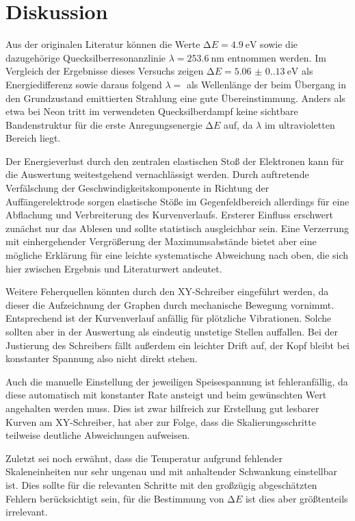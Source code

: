 \section{Diskussion}
\label{sec:diskussion}

Aus der originalen Literatur \cite{franck_hertz} können die Werte $\increment E = \qty{4.9}{\electronvolt}$ sowie die dazugehörige Quecksilberresonanzlinie
$\lambda = \qty{253.6}{\nano\meter}$ entnommen werden. Im Vergleich der Ergebnisse dieses Versuchs zeigen $\increment E = \qty{5.06(0.13)}{\electronvolt}$
als Energiedifferenz sowie daraus folgend $\lambda = $ als Wellenlänge der beim Übergang in den Grundzustand emittierten Strahlung eine
gute Übereinstimmung. Anders als etwa bei Neon tritt im verwendeten Quecksilberdampf keine sichtbare Bandenstruktur für die erste Anregungsenergie
$\increment E$ auf, da $\lambda$ im ultravioletten Bereich liegt. 

Der Energieverlust durch den zentralen elastischen Stoß der Elektronen kann für die Auswertung weitestgehend vernachlässigt werden. Durch auftretende
Verfälschung der Geschwindigkeitskomponente in Richtung der Auffängerelektrode sorgen elastische Stöße im Gegenfeldbereich allerdings für eine Abflachung und
Verbreiterung des Kurvenverlaufs. Ersterer Einfluss erschwert zunächst nur das Ablesen und sollte statistisch ausgleichbar sein. Eine Verzerrung
mit einhergehender Vergrößerung der Maximumsabstände bietet aber eine mögliche Erklärung für eine leichte systematische Abweichung nach oben, die sich
hier zwischen Ergebnis und Literaturwert andeutet.

Weitere Feherquellen könnten durch den XY-Schreiber eingeführt werden, da dieser die Aufzeichnung der Graphen durch mechanische Bewegung vornimmt.
Entsprechend ist der Kurvenverlauf anfällig für plötzliche Vibrationen. Solche sollten aber in der Auswertung als eindeutig unstetige Stellen auffallen.
Bei der Justierung des Schreibers fällt außerdem ein leichter Drift auf, der Kopf bleibt bei konstanter Spannung also nicht direkt stehen. 

Auch die manuelle Einstellung der jeweiligen Speisespannung ist fehleranfällig, da diese automatisch mit konstanter Rate ansteigt und beim gewünschten
Wert angehalten werden muss. Dies ist zwar hilfreich zur Erstellung gut lesbarer Kurven am XY-Schreiber, hat aber zur Folge, dass die Skalierungsschritte
teilweise deutliche Abweichungen aufweisen. 

Zuletzt sei noch erwähnt, dass die Temperatur aufgrund fehlender Skaleneinheiten nur sehr ungenau und mit anhaltender Schwankung einstellbar ist. Dies
sollte für die relevanten Schritte mit den großzügig abgeschätzten Fehlern berücksichtigt sein, für die Bestimmung von $\increment E$ ist dies aber
größtenteils irrelevant.
\newpage
